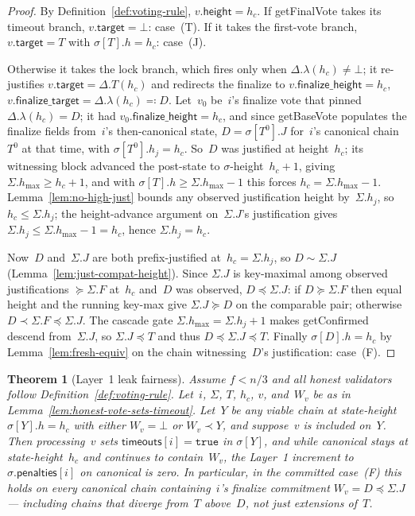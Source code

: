 \ifx\litemode\undefined\documentclass{article}\fi
\newcommand{\target}{\mathsf{target}}
\newcommand{\height}{\mathsf{height}}
\newcommand{\finalizeHeight}{\mathsf{finalize\_height}}
\newcommand{\finalizeTarget}{\mathsf{finalize\_target}}
\newcommand{\timeouts}{\mathsf{timeouts}}
\newcommand{\penalties}{\mathsf{penalties}}
\newcommand{\hmax}{\ensuremath{h_{\max}}\xspace}
\newcommand{\getBaseVote}{\textsf{getBaseVote}\xspace}
\newcommand{\getFinalVote}{\textsf{getFinalVote}\xspace}
\newcommand{\getConfirmed}{\textsf{getConfirmed}\xspace}
\theoremstyle{plain}
\newtheorem{theorem}{Theorem}
\theoremstyle{definition}
\theoremstyle{remark}
\begin{document}
\begin{proof}
By Definition~\ref{def:voting-rule}, $v.\height = h_c$.
If \getFinalVote takes its timeout branch, $v.\target = \bot$: case~(T).
If it takes the first-vote branch, $v.\target = T$ with $\sigma[T].h = h_c$: case~(J).

Otherwise it takes the lock branch, which fires only when $\Delta.\lambda(h_c) \neq \bot$; it re-justifies $v.\target = \Delta.T(h_c)$ and redirects the finalize to $v.\finalizeHeight = h_c$, $v.\finalizeTarget = \Delta.\lambda(h_c) \eqqcolon D$.
Let~$v_0$ be~$i$'s finalize vote that pinned $\Delta.\lambda(h_c) = D$; it had $v_0.\finalizeHeight = h_c$, and since \getBaseVote populates the finalize fields from~$i$'s then-canonical state, $D = \sigma[T^0].J$ for~$i$'s canonical chain~$T^0$ at that time, with $\sigma[T^0].h_j = h_c$.
So~$D$ was justified at height~$h_c$; its witnessing block advanced the post-state to $\sigma$-height~$h_c + 1$, giving $\Sigma.\hmax \geq h_c + 1$, and with $\sigma[T].h \geq \Sigma.\hmax - 1$ this forces $h_c = \Sigma.\hmax - 1$.
Lemma~\ref{lem:no-high-just} bounds any observed justification height by~$\Sigma.h_j$, so $h_c \leq \Sigma.h_j$; the height-advance argument on~$\Sigma.J$'s justification gives $\Sigma.h_j \leq \Sigma.\hmax - 1 = h_c$, hence $\Sigma.h_j = h_c$.

Now~$D$ and~$\Sigma.J$ are both prefix-justified at~$h_c = \Sigma.h_j$, so $D \sim \Sigma.J$ (Lemma~\ref{lem:just-compat-height}).
Since $\Sigma.J$ is key-maximal among observed justifications $\succeq \Sigma.F$ at~$h_c$ and~$D$ was observed, $D \preceq \Sigma.J$: if $D \succeq \Sigma.F$ then equal height and the running key-max give $\Sigma.J \succeq D$ on the comparable pair; otherwise $D \prec \Sigma.F \preceq \Sigma.J$.
The cascade gate $\Sigma.\hmax = \Sigma.h_j + 1$ makes \getConfirmed{} descend from~$\Sigma.J$, so $\Sigma.J \preceq T$ and thus $D \preceq \Sigma.J \preceq T$.
Finally $\sigma[D].h = h_c$ by Lemma~\ref{lem:fresh-equiv} on the chain witnessing~$D$'s justification: case~(F).
\end{proof}

\begin{theorem}[Layer~1 leak fairness]\label{thm:fairness}
Assume $f < n/3$ and all honest validators follow Definition~\ref{def:voting-rule}.
Let~$i$, $\Sigma$, $T$, $h_c$, $v$, and~$W_v$ be as in Lemma~\ref{lem:honest-vote-sets-timeout}.
Let~$Y$ be any viable chain at state-height $\sigma[Y].h = h_c$ with either $W_v = \bot$ or $W_v \prec Y$, and suppose~$v$ is included on~$Y$.
Then processing~$v$ sets $\timeouts[i] = \mathtt{true}$ in $\sigma[Y]$, and while canonical stays at state-height~$h_c$ and continues to contain~$W_v$, the Layer~1 increment to $\sigma.\penalties[i]$ on canonical is zero.
In particular, in the committed case~(F) this holds on every canonical chain containing~$i$'s finalize commitment $W_v = D \preceq \Sigma.J$ --- including chains that diverge from~$T$ above~$D$, not just extensions of~$T$.
\end{theorem}
\end{document}
